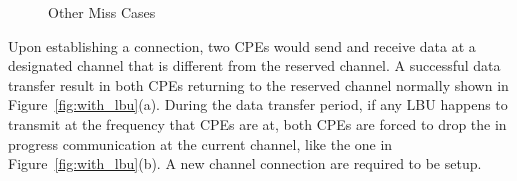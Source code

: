 \begin{figure}[ht]
{\begin{minipage}[c][1.4\width]{
	   0.31\textwidth}
	\end{minipage}}
 \hfill	
\caption{Other Miss Cases}
\label{fig:other_miss_cases}
\end{figure}

Upon establishing a connection, two CPEs would send and receive data at a designated channel that is different from the reserved channel. A successful data transfer result in both CPEs returning to the reserved channel normally shown in Figure~\ref{fig:with_lbu}(a). During the data transfer period, if any LBU happens to transmit at the frequency that CPEs are at, both CPEs are forced to drop the in progress communication at the current channel, like the one in Figure~\ref{fig:with_lbu}(b). A new channel connection are required to be setup. 

